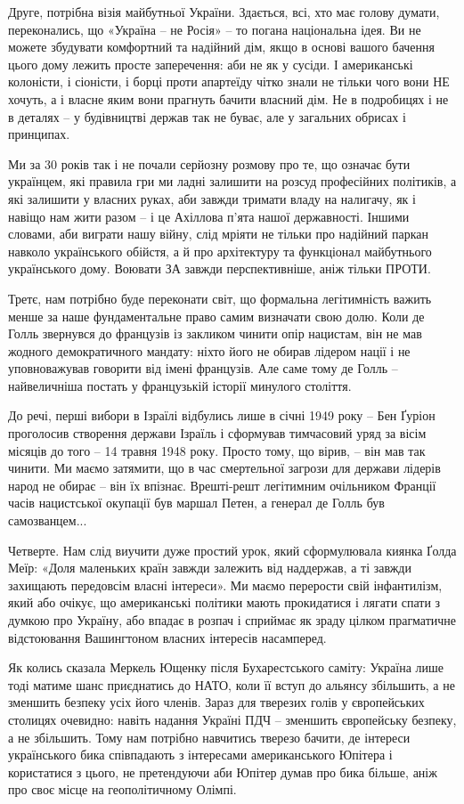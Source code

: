 Друге, потрібна візія майбутньої України. Здається, всі, хто має голову думати,
переконались, що «Україна – не Росія» – то погана національна ідея. Ви не
можете збудувати комфортний та надійний дім, якщо в основі вашого бачення цього
дому лежить просте заперечення: аби не як у сусіди. І американські колоністи, і
сіоністи, і борці проти апартеїду чітко знали не тільки чого вони НЕ хочуть, а
і власне яким вони прагнуть бачити власний дім. Не в подробицях і не в деталях
– у будівництві держав так не буває, але у загальних обрисах і принципах. 

Ми за 30 років так і не почали серйозну розмову про те, що означає бути
українцем, які правила гри ми ладні залишити на розсуд професійних політиків, а
які залишити у власних руках, аби завжди тримати владу на налигачу, як і навіщо
нам жити разом – і це Ахіллова п’ята нашої державності. Іншими словами, аби
виграти нашу війну, слід мріяти не тільки про надійний паркан навколо
українського обійстя, а й про архітектуру та функціонал майбутнього
українського дому. Воювати ЗА завжди перспективніше, аніж тільки ПРОТИ.

Третє, нам потрібно буде переконати світ, що формальна легітимність важить
менше за наше фундаментальне право самим визначати свою долю. Коли де Голль
звернувся до французів із закликом чинити опір нацистам, він не мав жодного
демократичного мандату: ніхто його не обирав лідером нації і не уповноважував
говорити від імені французів. Але саме тому де Голль – найвеличніша постать у
французькій історії минулого століття. 

До речі, перші вибори в Ізраїлі відбулись лише в січні 1949 року – Бен Ґуріон
проголосив створення держави Ізраїль і сформував тимчасовий уряд за вісім
місяців до того – 14 травня 1948 року. Просто тому, що вірив, – він мав так
чинити. Ми маємо затямити, що в час смертельної загрози для держави лідерів
народ не обирає – він їх впізнає. Врешті-решт легітимним очільником Франції
часів нацистської окупації був маршал Петен, а генерал де Голль був
самозванцем...

Четверте. Нам слід виучити дуже простий урок, який сформулювала киянка Ґолда
Меїр: «Доля маленьких країн завжди залежить від наддержав, а ті завжди
захищають передовсім власні інтереси». Ми маємо перерости свій інфантилізм,
який або очікує, що американські політики мають прокидатися і лягати спати з
думкою про Україну, або впадає в розпач і сприймає як зраду цілком прагматичне
відстоювання Вашингтоном власних інтересів насамперед.

Як колись сказала Меркель Ющенку після Бухарестського саміту: Україна лише тоді
матиме шанс приєднатись до НАТО, коли її вступ до альянсу збільшить, а не
зменшить безпеку усіх його членів. Зараз для тверезих голів у європейських
столицях очевидно: навіть надання Україні ПДЧ – зменшить європейську безпеку, а
не збільшить. Тому нам потрібно навчитись тверезо бачити, де інтереси
українського бика співпадають з інтересами американського Юпітера і користатися
з цього, не претендуючи аби Юпітер думав про бика більше, аніж про своє місце
на геополітичному Олімпі.


